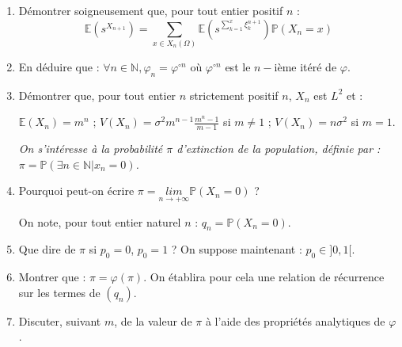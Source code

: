\begin{exer}
\begin{enumerate}
(on ne s'int\'eresse pas \`a l'espace de probabilit\'e sous-jacent).
\item D\'emontrer soigneusement que, pour tout entier positif $n$ :
\[\mathbb{E}\left(s^{X_{n+1}}\right)=\sum\limits_{x\in X_n(\Omega)}\mathbb{E}\left(s^{\sum\limits_{k=1}^{x}\xi_k^{n+1}}\right)\mathbb{P}(X_n=x)\]
\item En d\'eduire que : $\forall n\in\mathbb{N},\varphi_n=\varphi^{\circ n}$ o\`u $\varphi^{\circ n}$ est le $n-$i\`eme it\'er\'e de $\varphi$.
\item D\'emontrer que, pour tout entier $n$ strictement positif $n$, $X_n$ est $L^2$ et :
\begin{center}$\mathbb{E}(X_n)=m^n$ ; $V(X_n)=\sigma^2 m^{n-1}\frac{m^n-1}{m-1}$ si $m\neq 1$ ; $V(X_n)=n\sigma^2$ si $m=1$.\end{center}
\hspace*{-2em}\textit{On s'int\'eresse \`a la probabilit\'e $\pi$ d'extinction de la population, d\'efinie par : %
$\pi=\mathbb{P}(\exists n\in \mathbb{N} | x_n=0)$.}
\item Pourquoi peut-on \'ecrire $\pi =\underset{n\rightarrow +\infty}{lim}\mathbb{P}(X_n=0)$ ?

\medskip
On note, pour tout entier naturel $n$ : $q_n=\mathbb{P}(X_n=0)$.
\item Que dire de $\pi$ si $p_0=0$, $p_0=1$ ?
On suppose maintenant : $p_0\in ]0,1[$.
\item Montrer que : $\pi=\varphi (\pi)$. On \'etablira pour cela une relation de r\'ecurrence sur les termes de $(q_n)$.
\item Discuter, suivant $m$, de la valeur de $\pi$ \`a l'aide des propri\'et\'es analytiques de $\varphi$.
\end{enumerate}
\end{exer}


